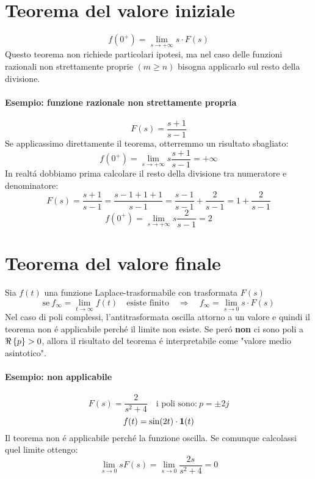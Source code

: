 \documentclass[../main.tex]{subfiles}
\begin{document}
	\section{Teorema del valore iniziale}
		\[
			f(0^+) = \lim\limits_{s \rightarrow +\infty} s \cdot F(s)
		\]
		Questo teorema non richiede particolari ipotesi, ma nel caso delle funzioni razionali non strettamente proprie $ (m \geq n) $ bisogna applicarlo sul resto della divisione.
		
	\begin{mdframed}[style=Esempio]
		\paragraph{Esempio: funzione razionale non strettamente propria}
		\[ 
			F(s) = \frac{s+1}{s-1} 
		\]
		Se applicassimo direttamente il teorema, otterremmo un risultato sbagliato:
		\[ 
			f(0^+) = \lim\limits_{s \rightarrow +\infty}s \frac{s+1}{s-1} = +\infty
		\]
		In realt\'{a} dobbiamo prima calcolare il resto della divisione tra numeratore e denominatore:
		\[ 
			F(s) = \frac{s+1}{s-1} = \frac{s-1+1+1}{s-1} = \frac{s-1}{s-1} + \frac{2}{s-1} = 1 + \frac{2}{s-1} 
		\]
		\[ 
			f(0^+) = \lim\limits_{s \rightarrow +\infty} s \frac{2}{s-1} = 2 
		\]
	\end{mdframed}

	\section{Teorema del valore finale}
		Sia $ f(t) $ una funzione Laplace-trasformabile con trasformata $ F(s) $
		\[ 
			\text{se}\ f_\infty = \lim\limits_{t \rightarrow \infty} f(t) \quad \text{esiste finito} \quad\Rightarrow\quad f_\infty = \lim\limits_{s \rightarrow 0} s \cdot F(s)
		\]
		Nel caso di poli complessi, l'antitrasformata oscilla attorno a un valore e quindi il teorema non \'{e} applicabile perch\'{e} il limite non esiste. Se per\'{o} \textbf{non} ci sono poli a $ \Re \left\lbrace p \right\rbrace > 0 $, allora il risultato del teorema \'{e} interpretabile come "valore medio asintotico".
		
	\begin{mdframed}[style=Esempio]
		\paragraph{Esempio: non applicabile}
		\[ 
			F(s) = \frac{2}{s^2+4} \quad \text{i poli sono:}\ p = \pm 2j
		\]
		\[ 
			f(t) = \sin(2t) \cdot \textbf{1}(t)
		\]
		Il teorema non \'{e} applicabile perch\'{e} la funzione oscilla. Se comunque calcolassi quel limite ottengo:
		\[
			\lim\limits_{s \rightarrow 0} s F(s) = \lim\limits_{s \rightarrow 0} \frac{2s}{s^2 + 4} = 0
		\]
	\end{mdframed}
\end{document}
